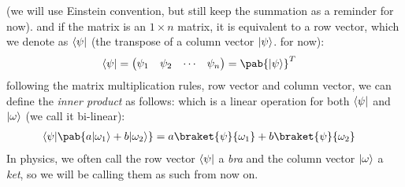 (we will use Einstein convention, but still keep the summation as a reminder for now).
and if the matrix is an $1 \times n$ matrix, it is equivalent to a row vector, which we denote as $\langle\psi\rvert$ (the transpose of a column vector $\lvert\psi\rangle$. for now):
\begin{align}
  \bra{\psi} & = \begin{pmatrix}
                   \psi_1 & \psi_2 & \cdots & \psi_n
                 \end{pmatrix} = \pab{\ket{\psi}}^T
  \label{eq:bra_vector}
\end{align}
following the matrix multiplication rules, row vector and column vector, we can define the \emph{inner product} as follows:
which is a linear operation for both $\langle\psi\rvert$ and $\lvert\omega\rangle$ (we call it bi-linear):
\begin{align}
  \bra{\psi}\pab{a \ket{\omega_1} + b \ket{\omega_2}} & = a \braket{\psi}{\omega_1} + b \braket{\psi}{\omega_2}
  \label{eq:braketop}
\end{align}
In physics, we often call the row vector $\langle\psi\rvert$ a \emph{bra} and the column vector $\lvert\omega\rangle$ a \emph{ket}, so we will be calling them as such from now on.

